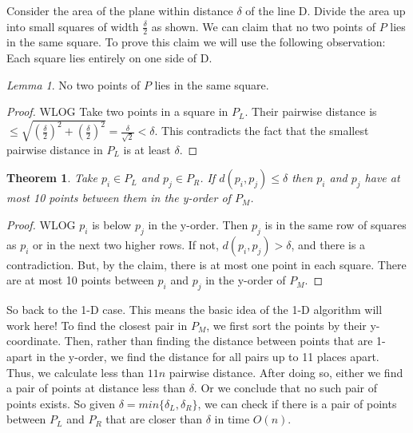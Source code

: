 \documentclass[11pt, a4paper, oneside]{book}
\theoremstyle{theoremdd}
\newtheorem{theorem}{Theorem}[chapter]
\theoremstyle{remark}
\newtheorem{lemma}{Lemma}[section]
\begin{document}
Consider the area of the plane within distance $\delta$ of the line D. Divide the area up into small squares of width $\frac{\delta}{2}$ as shown. We can claim that no two points of $P$ lies in the same square. To prove this claim we will use the following observation: Each square lies entirely on one side of D. 
\begin{lemma}
No two points of $P$ lies in the same square.
\end{lemma}
\begin{proof}
WLOG Take two points in a square in $P_{L}$. Their pairwise distance is $\leq \sqrt{(\frac{\delta}{2})^2+(\frac{\delta}{2})^2} = \frac{\delta}{\sqrt{2}} < \delta$. This contradicts the fact that the smallest pairwise distance in $P_{L}$ is at least $\delta$.
\end{proof}

\begin{theorem}
Take $p_{i}\in P_{L}$ and $p_{j}\in P_{R}$. If $d(p_{i},p_{j}) \leq \delta$ then $p_{i}$ and $p_{j}$ have at most 10 points between them in the y-order of $P_{M}$.
\end{theorem}
\begin{proof}
WLOG $p_{i}$ is below $p_{j}$ in the y-order. Then $p_{j}$ is in the same row of squares as $p_{i}$ or in the next two higher rows. If not, $d(p_{i},p_{j}) > \delta$, and there is a contradiction. But, by the claim, there is at most one point in each square.  \Rightarrow There are at most 10 points between $p_{i}$ and $p_{j}$ in the y-order of $P_{M}$.
\end{proof}

So back to the 1-D case. This means the basic idea of the 1-D algorithm will work here! To find the closest pair in $P_{M}$, we first sort the points by their y-coordinate. Then, rather than finding the distance between points that are 1-apart in the y-order, we find the distance for all pairs up to 11 places apart. Thus, we calculate less than $11n$ pairwise distance. After doing so, either we find a pair of points at distance less than $\delta$. Or we conclude that no such pair of points exists. So given $\delta = min\{\delta_{L}, \delta_{R}\}$, we can check if there is a pair of points between $P_{L}$ and $P_{R}$ that are closer than $\delta$ in time $O(n)$.
\end{document}
